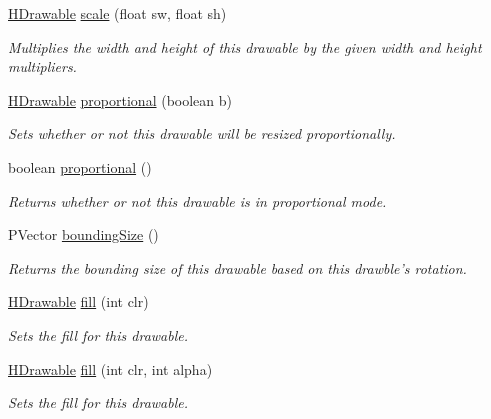 \begin{DoxyCompactItemize}
\hyperlink{classhype_1_1drawable_1_1_h_drawable}{H\-Drawable} \hyperlink{classhype_1_1drawable_1_1_h_drawable_aa40926c8864935d6d5b7ea16f3485f9f}{scale} (float sw, float sh)
\begin{DoxyCompactList}\small\item\em Multiplies the width and height of this drawable by the given width and height multipliers. \end{DoxyCompactList}\item 
\hyperlink{classhype_1_1drawable_1_1_h_drawable}{H\-Drawable} \hyperlink{classhype_1_1drawable_1_1_h_drawable_add4d7ddda7e479ab0c295ed5798ff313}{proportional} (boolean b)
\begin{DoxyCompactList}\small\item\em Sets whether or not this drawable will be resized proportionally. \end{DoxyCompactList}\item 
boolean \hyperlink{classhype_1_1drawable_1_1_h_drawable_a0b4162d5fbb7f045f84143beeafe4fb1}{proportional} ()
\begin{DoxyCompactList}\small\item\em Returns whether or not this drawable is in proportional mode. \end{DoxyCompactList}\item 
P\-Vector \hyperlink{classhype_1_1drawable_1_1_h_drawable_a70e91337f0ceafe27f5119e12063cc8e}{bounding\-Size} ()
\begin{DoxyCompactList}\small\item\em Returns the bounding size of this drawable based on this drawble's rotation. \end{DoxyCompactList}\item 
\hyperlink{classhype_1_1drawable_1_1_h_drawable}{H\-Drawable} \hyperlink{classhype_1_1drawable_1_1_h_drawable_aa0d3bfb3c918f18674b49bb6af4ec46b}{fill} (int clr)
\begin{DoxyCompactList}\small\item\em Sets the fill for this drawable. \end{DoxyCompactList}\item 
\hyperlink{classhype_1_1drawable_1_1_h_drawable}{H\-Drawable} \hyperlink{classhype_1_1drawable_1_1_h_drawable_a2448e52613f3bc717d251ad7320cf383}{fill} (int clr, int alpha)
\begin{DoxyCompactList}\small\item\em Sets the fill for this drawable. \end{DoxyCompactList}\item 

\end{DoxyCompactItemize}
